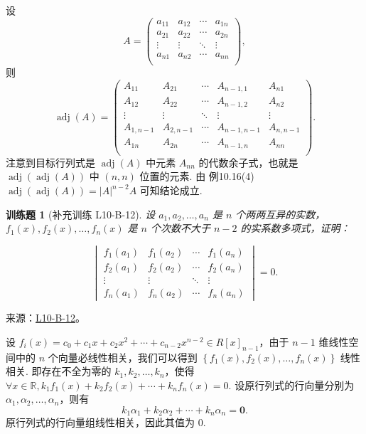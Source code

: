 \documentclass[UTF8,12pt,a4paper,fontset=fandol]{ctexart}
\newtheorem{exercise}{训练题}[section]
\begin{document}
\begin{solve}
设 \[A = \begin{pmatrix}
                a_{11} & a_{12} & \cdots & a_{1n} \\
                a_{21} & a_{22} & \cdots & a_{2n} \\
                \vdots & \vdots & \ddots & \vdots \\
                a_{n1} & a_{n2} & \cdots & a_{nn} \\
            \end{pmatrix},\]
            则 \[\operatorname{adj}(A) = \begin{pmatrix}
                    A_{11}     & A_{21}     & \cdots & A_{n-1, 1}   & A_{n1}     \\
                    A_{12}     & A_{22}     & \cdots & A_{n-1, 2}   & A_{n2}     \\
                    \vdots     & \vdots     & \ddots & \vdots       & \vdots     \\
                    A_{1, n-1} & A_{2, n-1} & \cdots & A_{n-1, n-1} & A_{n, n-1} \\
                    A_{1n}     & A_{2n}     & \cdots & A_{n-1, n}   & A_{nn}     \\
                \end{pmatrix}.\]
            注意到目标行列式是 $\operatorname{adj}(A)$ 中元素 $A_{nn}$ 的代数余子式，也就是 $\operatorname{adj}(\operatorname{adj}(A))$ 中 $(n, n)$ 位置的元素. 由 {例10.16(4)} $\operatorname{adj}(\operatorname{adj}(A)) = \lvert A \rvert^{n-2}A$ 可知结论成立.
\end{solve}

\begin{exercise}[补充训练 L10-B-12]\label{prob:L10-B-12}
设 $a_1,a_2,\ldots,a_n$ 是 $n$ 个两两互异的实数，$f_1(x),f_2(x),\ldots,f_n(x)$ 是 $n$ 个次数不大于 $n-2$ 的实系数多项式，证明：

        \[\begin{vmatrix}
                f_1(a_1) & f_1(a_2) & \cdots & f_1(a_n) \\
                f_2(a_1) & f_2(a_2) & \cdots & f_2(a_n) \\
                \vdots   & \vdots   & \ddots & \vdots   \\
                f_n(a_1) & f_n(a_2) & \cdots & f_n(a_n)
            \end{vmatrix}=0.\]
\end{exercise}
\noindent 来源：\href{https://github.com/yhwu-is/Linear-Algebra-Left-Undone/blob/new/%E8%AE%B2%E4%B9%89/%E4%B8%93%E9%A2%98/10%20%E8%A1%8C%E5%88%97%E5%BC%8F.tex}{L10-B-12}。
\begin{solve}
设 $f_i(x) = c_0 + c_1 x + c_2 x^2 + \cdots + c_{n-2} x^{n-2} \in R[x]_{n-1}$，由于 $n-1$ 维线性空间中的 $n$ 个向量必线性相关，我们可以得到 $\left\{ f_1(x), f_2(x), \ldots, f_n(x) \right\}$ 线性相关. 即存在不全为零的 $k_1, k_2, \ldots, k_n$，使得 $\forall x \in \mathbb{R}, k_1 f_1(x) + k_2 f_2(x) + \cdots + k_n f_n(x) = 0$. 设原行列式的行向量分别为 $\alpha_1, \alpha_2, \ldots, \alpha_n$，则有
            \[
                k_1 \alpha_1 + k_2 \alpha_2 + \cdots + k_n \alpha_n = \mathbf{0}.
            \]
            原行列式的行向量组线性相关，因此其值为 $0$.
\end{solve}
\end{document}
